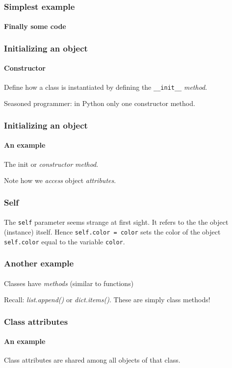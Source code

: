 \begin{frame}\frametitle{Simplest example}
    \framesubtitle{Finally some code}


\end{frame}

\begin{frame}[fragile]\frametitle{Initializing an object}
    \framesubtitle{Constructor}

    Define how a class is instantiated by defining the
    \verb|__init__| \textit{method}.

    \vfill

    Seasoned programmer: in Python only one constructor
    method.

\end{frame}

\begin{frame}\frametitle{Initializing an object}
    \framesubtitle{An example}
    The init or \textit{constructor} \textit{method}.


    Note how we \textit{access} object \textit{attributes}.

\end{frame}

\begin{frame}\frametitle{Self}
    \framesubtitle{}

    The \texttt{self} parameter seems strange at first sight.
    \vfill
    It refers to the the object (instance) itself.
    \vfill
    Hence \texttt{self.color = color} sets the color of the object
    \texttt{self.color} equal to the variable \texttt{color}.
    \vfill

\end{frame}

\begin{frame}\frametitle{Another example}
    \framesubtitle{}
    Classes have \textit{methods} (similar to functions)


    \pause

    Recall: \textit{list.append()} or \textit{dict.items()}.
    These are simply class methods!

\end{frame}

\begin{frame}\frametitle{Class attributes}
    \framesubtitle{An example}


    Class attributes are shared among all objects of that class.
\end{frame}

